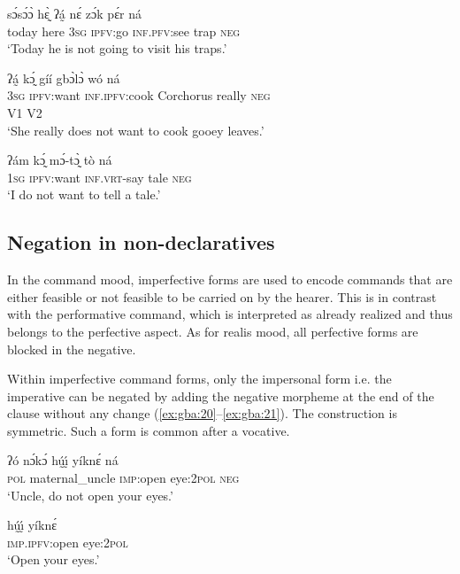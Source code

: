 \documentclass[output=paper,colorlinks=true, citecolor=brown]{langscibook}
\begin{document}
\ea\label{ex:gba:14}
    \gll sɔ́sɔ́ɔ̀ hɛ̰̀ ʔá̰    nɛ́ zɔ́k pɛ́r ná \\ 
         today here \textsc{3sg} \textsc{ipfv}:go \textsc{inf.pfv}:see trap \textsc{neg} \\
    \glt ‘Today he is not going to visit his traps.’
\z 
 
 \ea\label{ex:gba:15}
    \glll ʔá̰  kɔ̰́ gíí gbɔ̀lɔ̀ wó ná \\ 
         \textsc{3sg} \textsc{ipfv}:want \textsc{inf.ipfv}:cook {Corchorus} really \textsc{neg} \\ 
         {} {V1} {V2}\\
    \glt ‘She really does not want to cook gooey leaves.’
\z 

\ea\label{ex:gba:16}
    \gll ʔám kɔ̰́ mɔ́-tɔ̰̀ tò ná \\ 
         \textsc{1sg} \textsc{ipfv}:want \textsc{inf.vrt}-say tale \textsc{neg} \\
    \glt ‘I do not want to tell a tale.’
\z 

 
\subsection{Negation in non-declaratives}\label{sec:gba:2.2}

In the command mood, imperfective forms are used to encode commands that are either feasible or not feasible to be carried on by the hearer. This is in contrast with the performative command, which is interpreted as already realized and thus belongs to the perfective aspect. As for realis mood, all perfective forms are blocked in the negative.


 

Within imperfective command forms, only the impersonal form i.e. the imperative can be negated by adding the negative morpheme at the end of the clause without any change (\ref{ex:gba:20}--\ref{ex:gba:21}). The construction is symmetric. Such a form is common after a vocative.


\ea\label{ex:gba:20}
    \gll ʔó nɔ́kɔ́ hṵ́\'{ı̰}  yíknɛ́ ná  \\ 
         \textsc{pol} maternal\_uncle \textsc{imp}:open eye:\textsc{2pol} \textsc{neg}  \\
    \glt ‘Uncle, do not open your eyes.’ 
\z 
 
\ea\label{ex:gba:21}
    \gll hṵ́\'{ı̰}  yíknɛ́ \\ 
         \textsc{imp.ipfv}:open eye:\textsc{2pol}  \\
    \glt ‘Open your eyes.’
\z 
\end{document}
